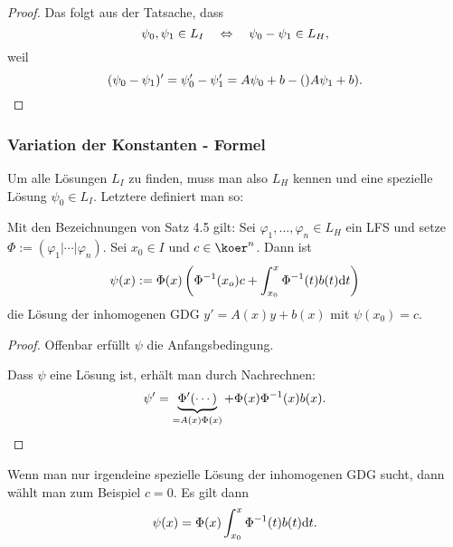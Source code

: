  \begin{proof}
   Das folgt aus der Tatsache, dass
   \[ \psi_0, \psi_1 \in L_I \quad \Leftrightarrow \quad \psi_0 - \psi_1 \in L_H, \]
   weil
   \[ (\psi_0 - \psi_1)' = \psi'_0 - \psi'_1 = A\psi_0 + b - ()A\psi_1 + b).
     \qedhere \]
 \end{proof}

\subsubsection{Variation der Konstanten - Formel}
Um alle Lösungen $L_I$ zu finden, muss man also $L_H$ kennen und eine spezielle
Lösung $\psi_0 \in L_I$. Letztere definiert man so:

\clearpage

\begin{thm}
  Mit den Bezeichnungen von Satz 4.5 gilt: Sei $\varphi_1, \ldots, \varphi_n \in
  L_H$ ein LFS und setze $\Phi := ( \varphi_1 | \cdots | \varphi_n)$. Sei $x_0
  \in I$ und $c \in \koer^n$. Dann ist
  \[ \psi(x) := \Phi(x) \left(  \Phi^{-1}(x_o) c + \int_{x_0}^x \Phi^{-1}(t)
      b(t) \mathrm{d} t \right) \]
  die Lösung der inhomogenen GDG $y' = A(x) y + b(x)$ mit $\psi(x_0) = c$.
\end{thm}

\begin{proof}
  Offenbar erfüllt $\psi$ die Anfangsbedingung.

  Dass $\psi$ eine Lösung ist, erhält man durch Nachrechnen:
  \[ \psi' = \underbrace{\Phi'(\cdots)}_{= A(x) \Phi(x)} + \Phi(x) \Phi^{-1}(x)
    b(x). \qedhere \]
\end{proof}

\begin{rmrk}
  Wenn man nur irgendeine spezielle Lösung der inhomogenen GDG sucht, dann wählt
  man zum Beispiel $c=0$. Es gilt dann
  \[ \psi(x) = \Phi(x) \int_{x_0}^x \Phi^{-1}(t) b(t) \mathrm{d} t. \]
\end{rmrk}

